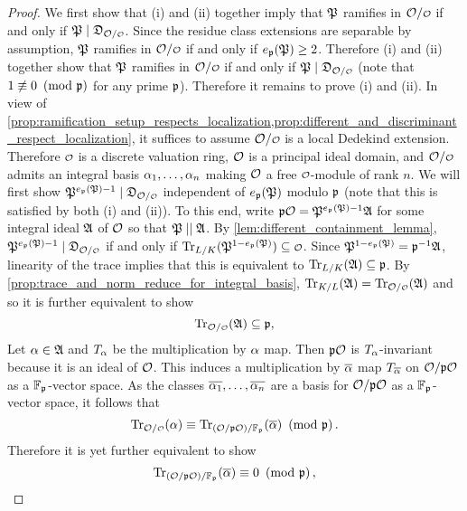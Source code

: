     \begin{proof}
      We first show that (i) and (ii) together imply that $\mathfrak{P}$ ramifies in $\mc{O}/\smc{O}$ if and only if $\mf{P} \mid \mf{D}_{\mc{O}/\smc{O}}$. Since the residue class extensions are separable by assumption, $\mathfrak{P}$ ramifies in $\mc{O}/\smc{O}$ if and only if $e_{\mathfrak{p}}(\mathfrak{P}) \ge 2$. Therefore (i) and (ii) together show that $\mathfrak{P}$ ramifies in $\mc{O}/\smc{O}$ if and only if $\mf{P} \mid \mf{D}_{\mc{O}/\smc{O}}$ (note that $1 \not\equiv 0 \ \left(\text{mod }\mathfrak{p}\right)$ for any prime $\mathfrak{p}$). Therefore it remains to prove (i) and (ii). In view of \cref{prop:ramification_setup_respects_localization,prop:different_and_discriminant_respect_localization}, it suffices to assume $\mc{O}/\smc{O}$ is a local Dedekind extension. Therefore $\smc{O}$ is a discrete valuation ring, $\mathcal{O}$ is a principal ideal domain, and $\mc{O}/\smc{O}$ admits an integral basis $\alpha_{1},\ldots,\alpha_{n}$ making $\mathcal{O}$ a free $\smc{O}$-module of rank $n$. We will first show $\mf{P}^{e_{\mf{p}}(\mf{P})-1} \mid \mf{D}_{\mc{O}/\smc{O}}$ independent of $e_{\mathfrak{p}}(\mathfrak{P})$ modulo $\mathfrak{p}$ (note that this is satisfied by both (i) and (ii)). To this end, write $\mathfrak{p}\mathcal{O} = \mathfrak{P}^{e_{\mathfrak{p}}(\mathfrak{P})-1}\mathfrak{A}$ for some integral ideal $\mathfrak{A}$ of $\mathcal{O}$ so that $\mathfrak{P} \mid\mid \mathfrak{A}$. By \cref{lem:different_containment_lemma}, $\mf{P}^{e_{\mf{p}}(\mf{P})-1} \mid \mf{D}_{\mc{O}/\smc{O}}$ if and only if $\Trace_{L/K}(\mf{P}^{1-e_{\mf{p}}(\mf{P})}) \subseteq \smc{O}$. Since $\mathfrak{P}^{1-e_{\mathfrak{p}}(\mathfrak{P})} = \mathfrak{p}^{-1}\mathfrak{A}$, linearity of the trace implies that this is equivalent to $\operatorname{\mathrm{Tr}}_{L/K}(\mathfrak{A}) \subseteq \mathfrak{p}$. By \cref{prop:trace_and_norm_reduce_for_integral_basis}, $\Trace_{K/L}(\mf{A}) = \Trace_{\mc{O}/\smc{O}}(\mf{A})$ and so it is further equivalent to show
      \[
        \Trace_{\mc{O}/\smc{O}}(\mf{A}) \subseteq \mf{p},
      \]
      Let $\alpha \in \mathfrak{A}$ and $T_{\alpha}$ be the multiplication by $\alpha$ map. Then $\mathfrak{p}\mathcal{O}$ is $T_{\alpha}$-invariant because it is an ideal of $\mathcal{O}$. This induces a multiplication by $\overline{\alpha}$ map $T_{\overline{\alpha}}$ on $\mathcal{O}/\mathfrak{p}\mathcal{O}$ as a $\mathbb{F}_{\mathfrak{p}}$-vector space. As the classes $\overline{\alpha_{1}},\ldots,\overline{\alpha_{n}}$ are a basis for $\mathcal{O}/\mathfrak{p}\mathcal{O}$ as a $\mathbb{F}_{\mathfrak{p}}$-vector space, it follows that
      \[
        \Trace_{\mc{O}/\smc{O}}(\a) \equiv \Trace_{(\mc{O}/\mf{p}\mc{O})/\F_{\mf{p}}}(\conj{\a}) \tmod{\mf{p}}.
      \]
      Therefore it is yet further equivalent to show
      \[
        \operatorname{\mathrm{Tr}}_{(\mathcal{O}/\mathfrak{p}\mathcal{O})/\mathbb{F}_{\mathfrak{p}}}(\overline{\alpha}) \equiv 0 \ \left(\text{mod }\mathfrak{p}\right),
      \]

\end{proof}
